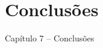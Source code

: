 

\section{Conclusões}

\begin{frame}

\begin{center}
{\huge Capítulo 7 -- Conclusões}
\end{center}

\end{frame}

